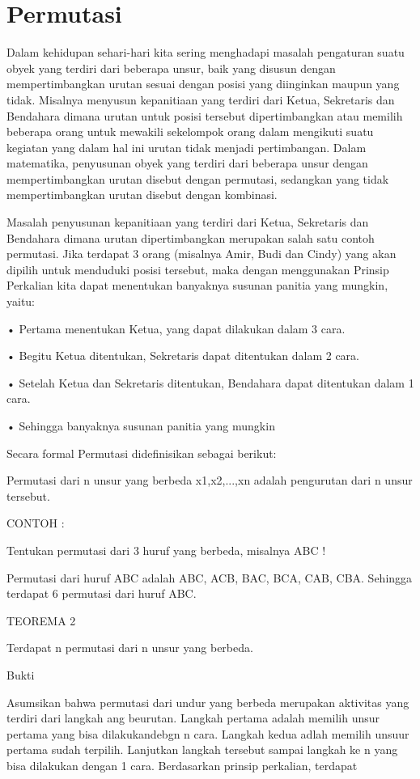 \documentclass[11pt,fleqn]{book} %
\begin{document}
\section{Permutasi}
	Dalam kehidupan sehari-hari kita sering menghadapi masalah pengaturan suatu obyek yang terdiri dari beberapa unsur, baik yang disusun dengan mempertimbangkan urutan sesuai dengan posisi yang diinginkan maupun yang tidak. Misalnya menyusun kepanitiaan yang terdiri dari Ketua, Sekretaris dan Bendahara dimana urutan untuk posisi tersebut dipertimbangkan atau memilih beberapa orang untuk mewakili sekelompok orang dalam mengikuti suatu kegiatan yang dalam hal ini urutan tidak menjadi pertimbangan. Dalam matematika, penyusunan obyek yang terdiri dari beberapa unsur dengan mempertimbangkan urutan disebut dengan permutasi, sedangkan yang tidak mempertimbangkan urutan disebut dengan kombinasi.


Masalah penyusunan kepanitiaan yang terdiri dari Ketua, Sekretaris dan Bendahara dimana urutan dipertimbangkan merupakan salah satu contoh permutasi. Jika terdapat 3 orang (misalnya Amir, Budi dan Cindy) yang akan dipilih untuk menduduki posisi tersebut, maka dengan menggunakan Prinsip Perkalian kita dapat menentukan banyaknya susunan panitia yang mungkin, yaitu:


• Pertama menentukan Ketua, yang dapat dilakukan dalam 3 cara.


• Begitu Ketua ditentukan, Sekretaris dapat ditentukan dalam 2 cara.


• Setelah Ketua dan Sekretaris ditentukan, Bendahara dapat ditentukan dalam 1 cara.

 
• Sehingga banyaknya susunan panitia yang mungkin


Secara formal Permutasi didefinisikan sebagai berikut:


Permutasi dari n unsur yang berbeda x1,x2,...,xn adalah pengurutan dari n unsur tersebut.


CONTOH :


Tentukan permutasi dari 3 huruf yang berbeda, misalnya ABC !


Permutasi dari huruf ABC adalah ABC, ACB, BAC, BCA, CAB, CBA. Sehingga terdapat 6 permutasi dari huruf ABC.

TEOREMA 2


Terdapat n permutasi dari n unsur yang berbeda.


Bukti


Asumsikan bahwa permutasi dari undur yang berbeda merupakan aktivitas yang terdiri dari langkah ang beurutan. Langkah pertama adalah memilih unsur pertama yang bisa dilakukandebgn n cara. Langkah kedua adlah memilih unsuur pertama sudah terpilih. Lanjutkan langkah tersebut sampai langkah ke n yang bisa dilakukan dengan 1 cara. Berdasarkan prinsip perkalian, terdapat
\end{document}

